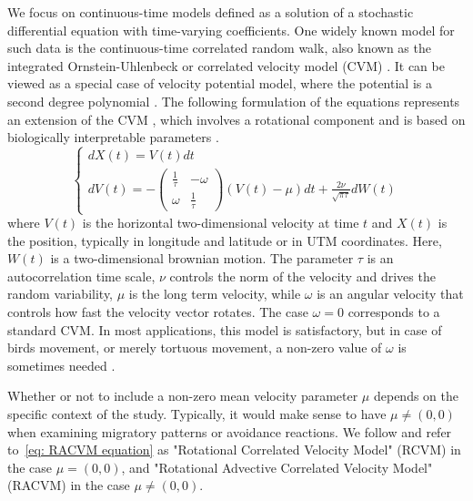 \documentclass[11pt]{article}
\newcommand {\1}{\mathbb{1}}
\begin{document}
We focus on continuous-time models defined as a solution of a stochastic differential equation with time-varying coefficients. One widely known model for such data is the continuous-time correlated random walk, also known as the integrated Ornstein-Uhlenbeck or correlated velocity model (CVM) \cite{johnson_continuoustime_2008}. It can be viewed as a special case of velocity potential model, where the potential is a second degree polynomial \cite{preisler_analyzing_2013}. The following formulation of the equations represents an extension of the CVM \cite{johnson_continuoustime_2008}, which involves a rotational component and  is based on biologically interpretable parameters \cite{gurarie_correlated_2017}.
\begin{equation} \left\{
	\begin{array}{l}
		dX(t)=V(t)dt \\
		dV(t)=-\begin{pmatrix} 
			\frac{1}{\tau} & -\omega \\
			\omega & \frac{1}{\tau}
		\end{pmatrix}(V(t)-\mu)dt+\frac{2\nu}{\sqrt{\pi \tau}} dW(t) 
	\end{array}
	\right.
	\label{eq: RACVM equation}
\end{equation}
where $V(t)$ is the horizontal two-dimensional velocity at time $t$ and $X(t)$ is the position, typically in longitude and latitude or in UTM coordinates. Here, $W(t)$ is a two-dimensional brownian motion. 
The parameter $\tau$ is an autocorrelation time scale, $\nu$ controls the norm of the velocity and drives the random variability, $\mu$ is the long term velocity, while $\omega$ is an angular velocity that controls how fast the velocity vector rotates. The case $\omega=0$ corresponds to a standard CVM. In most applications, this model is satisfactory, but in case of birds movement, or merely tortuous movement, a non-zero value of $\omega$ is sometimes needed \cite{gurarie_correlated_2017,alt_correlation_1990,albertsen_generalizing_2018}. 

Whether or not to include a non-zero mean velocity parameter $\mu$ depends on the specific context of the study. Typically, it would make sense to have $\mu\neq (0,0)$ when examining migratory patterns or avoidance reactions. We follow \cite{gurarie_correlated_2017} and refer to~\ref{eq: RACVM equation} as "Rotational Correlated Velocity Model" (RCVM) in the case $\mu=(0,0)$, and "Rotational Advective Correlated Velocity Model" (RACVM) in the case $\mu \neq (0,0)$.\\
\end{document}
